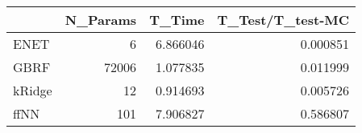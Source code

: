 \begin{tabular}{lrrr}
\toprule
{} &  N\_Params &    T\_Time &  T\_Test/T\_test-MC \\
\midrule
ENET   &         6 &  6.866046 &          0.000851 \\
GBRF   &     72006 &  1.077835 &          0.011999 \\
kRidge &        12 &  0.914693 &          0.005726 \\
ffNN   &       101 &  7.906827 &          0.586807 \\
\bottomrule
\end{tabular}
